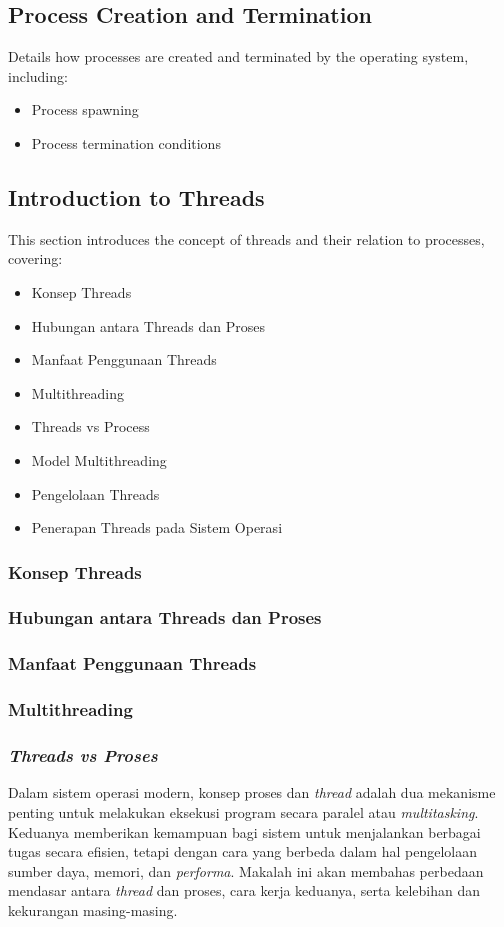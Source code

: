 \documentclass[12pt]{article}
\begin{document}
\subsection{Process Creation and Termination}
Details how processes are created and terminated by the operating system, including:
\begin{itemize}
    \item Process spawning
    \item Process termination conditions
\end{itemize}

\subsection{Introduction to Threads}
This section introduces the concept of threads and their relation to processes, covering:
\begin{itemize}
    \item Konsep Threads
    \item Hubungan antara Threads dan Proses
    \item Manfaat Penggunaan Threads
    \item Multithreading
    \item Threads vs Process
    \item Model Multithreading
    \item Pengelolaan Threads
    \item Penerapan Threads pada Sistem Operasi
\end{itemize}
\subsubsection{Konsep Threads}
\subsubsection{Hubungan antara Threads dan Proses}
\subsubsection{Manfaat Penggunaan Threads}
\subsubsection{Multithreading}
\subsubsection{\textit{Threads vs Proses}}
Dalam sistem operasi modern, konsep proses dan \textit{thread} adalah dua mekanisme penting untuk melakukan eksekusi program secara paralel atau \textit{multitasking}. Keduanya memberikan kemampuan bagi sistem untuk menjalankan berbagai tugas secara efisien, tetapi dengan cara yang berbeda dalam hal pengelolaan sumber daya, memori, dan \textit{performa}. Makalah ini akan membahas perbedaan mendasar antara \textit{thread} dan proses, cara kerja keduanya, serta kelebihan dan kekurangan masing-masing.
\end{document}
